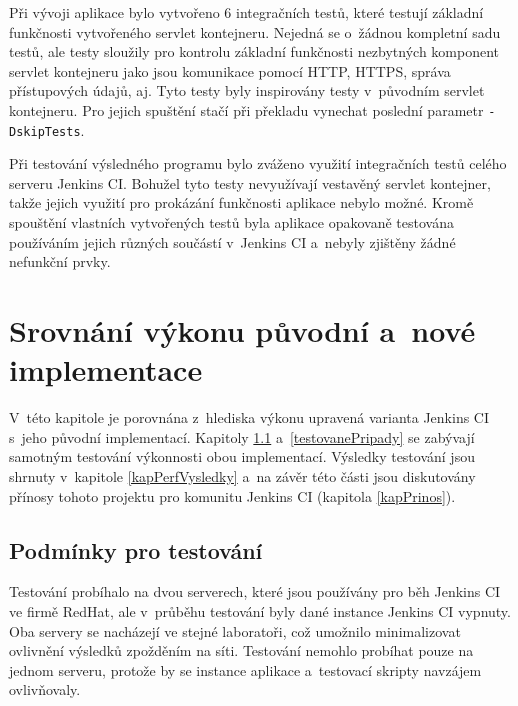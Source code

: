     \medskip
    Při vývoji aplikace bylo vytvořeno 6 integračních testů, které testují základní funkčnosti
    vytvořeného servlet kontejneru. Nejedná se o~žádnou kompletní sadu testů, ale testy sloužily pro
    kontrolu základní funkčnosti nezbytných komponent servlet kontejneru jako jsou
    komunikace pomocí HTTP, HTTPS, správa přístupových údajů, aj. Tyto testy byly inspirovány
    testy v~původním servlet kontejneru. Pro jejich spuštění stačí při překladu vynechat poslední
    parametr \texttt{-DskipTests}.

    Při testování výsledného programu bylo zváženo využití integračních testů celého serveru Jenkins CI.
    Bohužel tyto testy nevyužívají vestavěný servlet kontejner, takže jejich využití
    pro prokázání funkčnosti aplikace nebylo možné.
    Kromě spouštění vlastních vytvořených testů byla aplikace opakovaně testována používáním jejich různých součástí
    v~Jenkins CI
    a~nebyly zjištěny žádné nefunkční prvky.

    


\chapter{Srovnání výkonu původní a~nové implementace}  \label{kapPerformance}
    V~této kapitole je porovnána z~hlediska výkonu upravená varianta Jenkins CI s~jeho původní implementací.
    Kapitoly \ref{kapPodminky} a~\ref{testovanePripady} se zabývají samotným testování
    výkonnosti obou implementací. Výsledky testování jsou shrnuty v~kapitole \ref{kapPerfVysledky}
    a~na závěr této části jsou diskutovány přínosy tohoto projektu pro komunitu Jenkins CI (kapitola \ref{kapPrinos}).

    \section{Podmínky pro testování}\label{kapPodminky}
        Testování probíhalo na dvou serverech, které jsou používány pro běh Jenkins CI ve firmě RedHat, ale
        v~průběhu testování byly dané instance Jenkins CI vypnuty. 
        Oba servery se nacházejí ve stejné laboratoři, což umožnilo minimalizovat
        ovlivnění výsledků zpožděním na síti. Testování nemohlo probíhat pouze na jednom
        serveru, protože by se instance aplikace a~testovací skripty navzájem ovlivňovaly.
        
